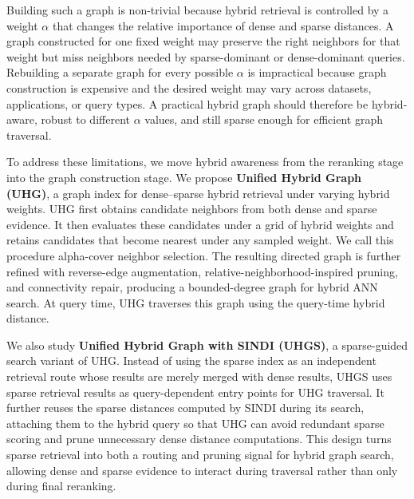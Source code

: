 Building such a graph is non-trivial because hybrid retrieval is controlled by a weight $\alpha$ that changes the relative importance of dense and sparse distances. A graph constructed for one fixed weight may preserve the right neighbors for that weight but miss neighbors needed by sparse-dominant or dense-dominant queries. Rebuilding a separate graph for every possible $\alpha$ is impractical because graph construction is expensive and the desired weight may vary across datasets, applications, or query types. A practical hybrid graph should therefore be hybrid-aware, robust to different $\alpha$ values, and still sparse enough for efficient graph traversal.

To address these limitations, we move hybrid awareness from the reranking stage into the graph construction stage. We propose \textbf{Unified Hybrid Graph (UHG)}, a graph index for dense--sparse hybrid retrieval under varying hybrid weights. UHG first obtains candidate neighbors from both dense and sparse evidence. It then evaluates these candidates under a grid of hybrid weights and retains candidates that become nearest under any sampled weight. We call this procedure alpha-cover neighbor selection. The resulting directed graph is further refined with reverse-edge augmentation, relative-neighborhood-inspired pruning, and connectivity repair, producing a bounded-degree graph for hybrid ANN search. At query time, UHG traverses this graph using the query-time hybrid distance.

We also study \textbf{Unified Hybrid Graph with SINDI (UHGS)}, a sparse-guided search variant of UHG. Instead of using the sparse index as an independent retrieval route whose results are merely merged with dense results, UHGS uses sparse retrieval results as query-dependent entry points for UHG traversal. It further reuses the sparse distances computed by SINDI during its search, attaching them to the hybrid query so that UHG can avoid redundant sparse scoring and prune unnecessary dense distance computations. This design turns sparse retrieval into both a routing and pruning signal for hybrid graph search, allowing dense and sparse evidence to interact during traversal rather than only during final reranking.

